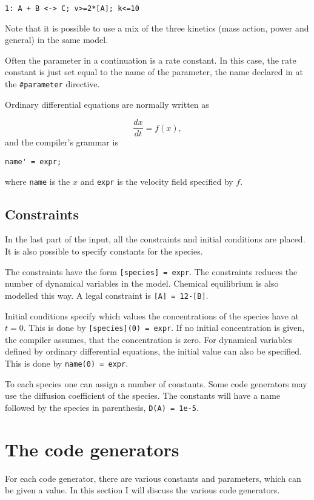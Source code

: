 \begin{verbatim}
1: A + B <-> C; v>=2*[A]; k<=10
\end{verbatim}

Note that it is possible to use a mix of the three kinetics (mass action, power
and general) in the same model.

Often the parameter in a continuation is a rate constant. In this
case, the rate constant is just set equal to the name of the
parameter, \ie the name declared in at the {\tt \#}{\tt parameter} directive.

Ordinary differential equations are normally written as

\[
  \frac{dx}{dt} = f(x),
\]
and the compiler's grammar is

\begin{verbatim}
name' = expr;
\end{verbatim}
where {\tt name} is the $x$ and {\tt expr} is the velocity field specified
by $f$. 

\subsection{Constraints}
\label{SpecConst}
In the last part of the input, all the constraints and initial conditions are
placed. It is also possible to specify constants for the species. 

The constraints have the form {\tt [species] = expr}. The constraints reduces
the number of dynamical variables in the model. Chemical equilibrium
is also modelled this way. A legal constraint is {\tt [A] = 12-[B]}.

Initial conditions specify which values the concentrations of the species have
at $t=0$. This is done by {\tt [species](0) = expr}. If no initial
concentration is given, the compiler assumes, that the concentration is
zero. For dynamical variables defined by ordinary differential
equations, the initial value can also be specified. This is done by
{\tt name(0) = expr}. 

To each species one can assign a number of constants. Some code generators 
may use \eg the diffusion coefficient of the species. The constants 
will have a name followed by the species in parenthesis, \eg
{\tt D(A) = 1e-5}. 

\newpage
\section{The code generators}
For each code generator, there are various constants and parameters,
which can be given a value. In this section I will discuss the various code
generators.

